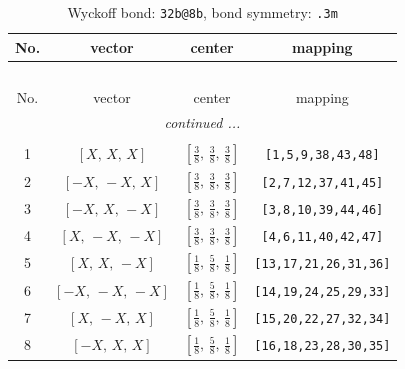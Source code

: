 \documentclass[fleqn,8pt]{jsarticle}
\begin{document}
\begin{longtable}{cccc}
\caption{Wyckoff bond: {\tt 32b@8b}, bond symmetry: {\tt .3m}}
 \\
 \hline \hline
No. & vector & center & mapping \\ \hline \endfirsthead

\multicolumn{3}{l}{\tablename\ \thetable{}} \\
 \hline \hline
No. & vector & center & mapping \\ \hline \endhead

 \hline \hline
\multicolumn{3}{r}{\footnotesize\it continued ...} \\ \endfoot

 \hline \hline
\multicolumn{3}{r}{} \\ \endlastfoot

1 & $\left[ X,\, X,\, X \right]$ & $\left[ \frac{3}{8},\, \frac{3}{8},\, \frac{3}{8} \right]$ & {\tt [1,5,9,38,43,48]} \\ \hline
2 & $\left[ - X,\, - X,\, X \right]$ & $\left[ \frac{3}{8},\, \frac{3}{8},\, \frac{3}{8} \right]$ & {\tt [2,7,12,37,41,45]} \\ \hline
3 & $\left[ - X,\, X,\, - X \right]$ & $\left[ \frac{3}{8},\, \frac{3}{8},\, \frac{3}{8} \right]$ & {\tt [3,8,10,39,44,46]} \\ \hline
4 & $\left[ X,\, - X,\, - X \right]$ & $\left[ \frac{3}{8},\, \frac{3}{8},\, \frac{3}{8} \right]$ & {\tt [4,6,11,40,42,47]} \\ \hline
5 & $\left[ X,\, X,\, - X \right]$ & $\left[ \frac{1}{8},\, \frac{5}{8},\, \frac{1}{8} \right]$ & {\tt [13,17,21,26,31,36]} \\ \hline
6 & $\left[ - X,\, - X,\, - X \right]$ & $\left[ \frac{1}{8},\, \frac{5}{8},\, \frac{1}{8} \right]$ & {\tt [14,19,24,25,29,33]} \\ \hline
7 & $\left[ X,\, - X,\, X \right]$ & $\left[ \frac{1}{8},\, \frac{5}{8},\, \frac{1}{8} \right]$ & {\tt [15,20,22,27,32,34]} \\ \hline
8 & $\left[ - X,\, X,\, X \right]$ & $\left[ \frac{1}{8},\, \frac{5}{8},\, \frac{1}{8} \right]$ & {\tt [16,18,23,28,30,35]} \\
\end{longtable}
\renewcommand{\arraystretch}{1.2}
\end{document}
